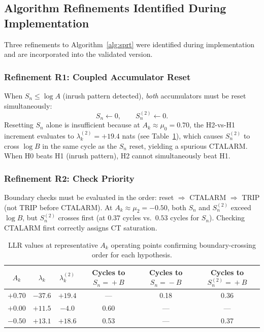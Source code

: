 \documentclass[11pt, a4paper]{article}
\newcommand{\Ak}{A_k}
\newcommand{\Sn}{S_n}
\newcommand{\logA}{\log A}
\newcommand{\logB}{\log B}
\begin{document}
\subsection{Algorithm Refinements Identified During Implementation}

Three refinements to Algorithm~\ref{alg:sprt} were identified during
implementation and are incorporated into the validated version.

\subsubsection*{Refinement R1: Coupled Accumulator Reset}

When $\Sn \leq \logA$ (inrush pattern detected), \emph{both} accumulators
must be reset simultaneously:
\[
  \Sn \leftarrow 0, \qquad \Sn^{(2)} \leftarrow 0.
\]
Resetting $\Sn$ alone is insufficient because at $\Ak \approx \mu_0 = 0.70$,
the H2-vs-H1 increment evaluates to $\lambda_k^{(2)} = +19.4$ nats
(see Table~\ref{tab:llr_values}), which causes $\Sn^{(2)}$ to cross $\logB$
in the same cycle as the $\Sn$ reset, yielding a spurious CTALARM.  When H0
beats H1 (inrush pattern), H2 cannot simultaneously beat H1.

\subsubsection*{Refinement R2: Check Priority}

Boundary checks must be evaluated in the order: reset $\Rightarrow$
CTALARM $\Rightarrow$ TRIP (not TRIP before CTALARM).  At
$\Ak \approx \mu_2 = -0.50$, both $\Sn$ and $\Sn^{(2)}$ exceed $\logB$,
but $\Sn^{(2)}$ crosses first (at $0.37$ cycles vs.\ $0.53$ cycles for
$\Sn$).  Checking CTALARM first correctly assigns CT saturation.

\begin{table}[!t]
\centering
\caption{LLR values at representative $A_k$ operating points
         confirming boundary-crossing order for each hypothesis.}
\label{tab:llr_values}
\renewcommand{\arraystretch}{1.10}
\begin{tabular}{cccccc}
\toprule
$A_k$ & $\lambda_k$ & $\lambda_k^{(2)}$ &
  Cycles to $\Sn\!=\!+B$ & Cycles to $\Sn\!=\!-B$ &
  Cycles to $\Sn^{(2)}\!=\!+B$ \\
\midrule
$+0.70$ & $-37.6$ & $+19.4$ & ---  & 0.18 & 0.36 \\
$+0.00$ & $+11.5$ & $-4.0$  & 0.60 & ---  & ---  \\
$-0.50$ & $+13.1$ & $+18.6$ & 0.53 & ---  & 0.37 \\
\bottomrule
\end{tabular}
\end{table}
\end{document}
